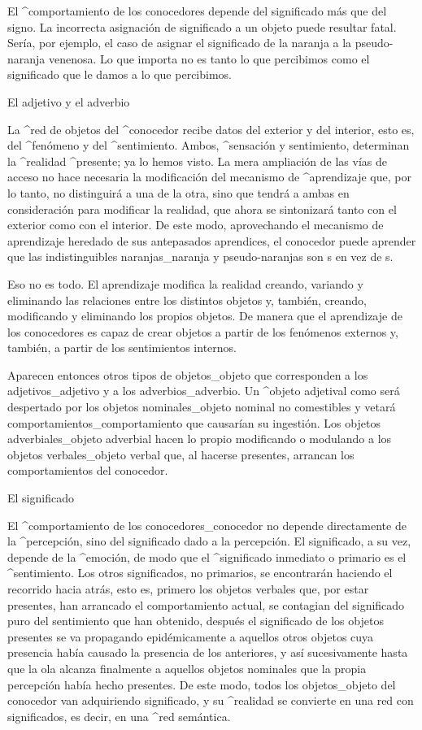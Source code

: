 
El ^{comportamiento} de los conocedores depende del significado más que
del signo. La incorrecta asignación de significado a un objeto puede
resultar fatal. Sería, por ejemplo, el caso de asignar el significado de
la naranja a la pseudo-naranja venenosa. Lo que importa no es tanto lo
que percibimos como el significado que le damos a lo que percibimos.


\Section El adjetivo y el adverbio

La ^{red de objetos} del ^{conocedor} recibe datos del exterior y del
interior, esto es, del ^{fenómeno} y del ^{sentimiento}. Ambos,
^{sensación} y sentimiento, determinan la ^{realidad} ^{presente}; ya lo
hemos visto. La mera ampliación de las vías de acceso no hace necesaria
la modificación del mecanismo de ^{aprendizaje} que, por lo tanto, no
distinguirá a una de la otra, sino que tendrá a ambas en consideración
para modificar la realidad, que ahora se sintonizará tanto con el
exterior como con el interior. De este modo, aprovechando el mecanismo
de aprendizaje heredado de sus antepasados aprendices, el conocedor
puede aprender que las indistinguibles naranjas_{naranja} y
pseudo-naranjas son s en vez de s.

Eso no es todo. El aprendizaje modifica la realidad creando, variando y
eliminando las relaciones entre los distintos objetos y, también,
creando, modificando y eliminando los propios objetos. De manera que el
aprendizaje de los conocedores es capaz de crear objetos a partir de los
fenómenos externos y, también, a partir de los sentimientos internos.

Aparecen entonces otros tipos de objetos_{objeto} que corresponden a los
adjetivos_{adjetivo} y a los adverbios_{adverbio}. Un ^{objeto
adjetival} como  será despertado por los objetos
nominales_{objeto nominal} no comestibles y vetará
comportamientos_{comportamiento} que causarían su ingestión. Los objetos
adverbiales_{objeto adverbial} hacen lo propio modificando o modulando a
los objetos verbales_{objeto verbal} que, al hacerse presentes, arrancan
los comportamientos del conocedor.


\Section El significado

El ^{comportamiento} de los conocedores_{conocedor} no depende
directamente de la ^{percepción}, sino del significado dado a la
percepción. El significado, a su vez, depende de la ^{emoción}, de modo
que el ^{significado} inmediato o primario es el ^{sentimiento}. Los
otros significados, no primarios, se encontrarán haciendo el recorrido
hacia atrás, esto es, primero los objetos verbales que, por estar
presentes, han arrancado el comportamiento actual, se contagian del
significado puro del sentimiento que han obtenido, después el
significado de los objetos presentes se va propagando epidémicamente a
aquellos otros objetos cuya presencia había causado la presencia de los
anteriores, y así sucesivamente hasta que la ola alcanza finalmente a
aquellos objetos nominales que la propia percepción había hecho
presentes. De este modo, todos los objetos_{objeto} del conocedor van
adquiriendo significado, y su ^{realidad} se convierte en una red con
significados, es decir, en una ^{red semántica}.

